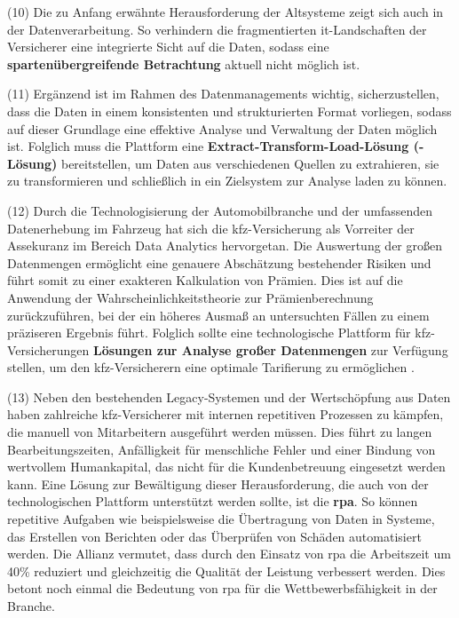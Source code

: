 (10) Die zu Anfang erwähnte Herausforderung der Altsysteme zeigt sich auch in der Datenverarbeitung. So verhindern die fragmentierten \ac{it}-Landschaften der Versicherer eine integrierte Sicht auf die Daten, sodass eine \textbf{spartenübergreifende Betrachtung} aktuell nicht möglich ist. \autocite[Vgl.][S. 11]{GUNTER2020}

(11) Ergänzend ist im Rahmen des Datenmanagements wichtig, sicherzustellen, dass die Daten in einem konsistenten und strukturierten Format vorliegen, sodass auf dieser Grundlage eine effektive Analyse und Verwaltung der Daten möglich ist. Folglich muss die Plattform eine \textbf{Extract-Transform-Load-Lösung (-Lösung)} bereitstellen, um Daten aus verschiedenen Quellen zu extrahieren, sie zu transformieren und schließlich in ein Zielsystem zur Analyse laden zu können. \autocite[Vgl.][]{WEINGARTNER2023}

\newpage

(12) Durch die Technologisierung der Automobilbranche und der umfassenden Datenerhebung im Fahrzeug hat sich die \ac{kfz}-Versicherung als Vorreiter der Assekuranz im Bereich Data Analytics hervorgetan. \autocite[Vgl.][S. 187]{GATZERT2023} Die Auswertung der großen Datenmengen ermöglicht eine genauere Abschätzung bestehender Risiken und führt somit zu einer exakteren Kalkulation von Prämien. Dies ist auf die Anwendung der Wahrscheinlichkeitstheorie zur Prämienberechnung zurückzuführen, bei der ein höheres Ausmaß an untersuchten Fällen zu einem präziseren Ergebnis führt. Folglich sollte eine technologische Plattform für \ac{kfz}-Versicherungen \textbf{Lösungen zur Analyse großer Datenmengen} zur Verfügung stellen, um den \ac{kfz}-Versicherern eine optimale Tarifierung zu ermöglichen \autocite[Vgl.][S. 146]{MANGEI2019}. 

(13) Neben den bestehenden Legacy-Systemen und der Wertschöpfung aus Daten haben zahlreiche \ac{kfz}-Versicherer mit internen repetitiven Prozessen zu kämpfen, die manuell von Mitarbeitern ausgeführt werden müssen. Dies führt zu langen Bearbeitungszeiten, Anfälligkeit für menschliche Fehler und einer Bindung von wertvollem Humankapital, das nicht für die Kundenbetreuung eingesetzt werden kann. Eine Lösung zur Bewältigung dieser Herausforderung, die auch von der technologischen Plattform unterstützt werden sollte, ist die \textbf{\ac{rpa}}. So können repetitive Aufgaben wie beispielsweise die Übertragung von Daten in Systeme, das Erstellen von Berichten oder das Überprüfen von Schäden automatisiert werden. \autocite[Vgl.][S. 296-298]{REICH2019} Die Allianz vermutet, dass durch den Einsatz von \ac{rpa} die Arbeitszeit um 40\% reduziert und gleichzeitig die Qualität der Leistung verbessert werden. Dies betont noch einmal die Bedeutung von \ac{rpa} für die Wettbewerbsfähigkeit in der Branche. \autocite[Vgl.][S. 296-298]{REICH2019}

